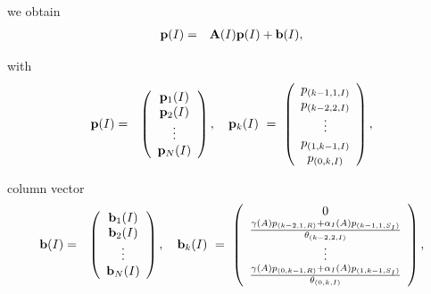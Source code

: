 \documentclass[preprint,12pt]{elsarticle}
\begin{document}
\par\noindent we obtain
\begin{eqnarray}\label{eqn:10}
 {\bf p}(I) &=& {\bf A}(I){\bf p}(I)+{\bf b}(I),
\end{eqnarray}
\par\noindent with
\begin{eqnarray*}
 {\bf p}(I) &=& \left(\begin{array}{c}
                         {\bf p}_1(I)\\
{\bf p}_2(I)\\
\vdots\\
{\bf p}_{N}(I)
\end{array}\right),\quad {\bf p}_k(I) \ = \ \left(\begin{array}{c}
p_{(k-1,1,I)}\\
p_{(k-2,2,I)}\\
\vdots\\
p_{(1,k-1,I)}\\
p_{(0,k,I)}
\end{array}\right),
\end{eqnarray*}
\par\noindent column vector
\begin{eqnarray*}
{\bf b}(I) &=& \left(\begin{array}{c}
                          {\bf b}_1(I)\\
{\bf b}_2(I)\\
\vdots\\
{\bf b}_{N}(I)
                         \end{array}\right),\quad
{\bf b}_k(I) \ = \ \left(\begin{array}{c}
               0\\
\frac{\gamma(A) p_{(k-2,1,R)}+\alpha_I(A) p_{(k-1,1,S_I)}}{\theta_{(k-2,2,I)}}\\
\vdots\\
\frac{\gamma(A)p_{(0,k-1,R)}+\alpha_I(A)p_{(1,k-1,S_I)}}{\theta_{(0,k,I)}}
                         \end{array}\right),
\end{eqnarray*}
\end{document}
